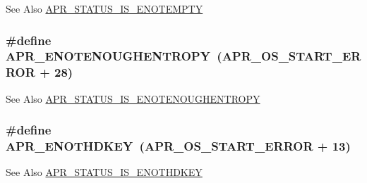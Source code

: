\begin{DoxySeeAlso}{See Also}
\hyperlink{group___a_p_r___s_t_a_t_u_s___i_s_ga6cced4e794d3e7ed6dae3e53c337cc02}{A\-P\-R\-\_\-\-S\-T\-A\-T\-U\-S\-\_\-\-I\-S\-\_\-\-E\-N\-O\-T\-E\-M\-P\-T\-Y} 
\end{DoxySeeAlso}
\hypertarget{group___a_p_r___error_gaaee9e4e763844197e3750bb66ff75cd0}{
\subsubsection[{A\-P\-R\-\_\-\-E\-N\-O\-T\-E\-N\-O\-U\-G\-H\-E\-N\-T\-R\-O\-P\-Y}]{\setlength{\rightskip}{0pt plus 5cm}\#define A\-P\-R\-\_\-\-E\-N\-O\-T\-E\-N\-O\-U\-G\-H\-E\-N\-T\-R\-O\-P\-Y~({\bf A\-P\-R\-\_\-\-O\-S\-\_\-\-S\-T\-A\-R\-T\-\_\-\-E\-R\-R\-O\-R} + 28)}}\label{group___a_p_r___error_gaaee9e4e763844197e3750bb66ff75cd0}
\begin{DoxySeeAlso}{See Also}
\hyperlink{group___a_p_r___s_t_a_t_u_s___i_s_gab8b0af2df80bfb9edfc8dbcbb6bdf925}{A\-P\-R\-\_\-\-S\-T\-A\-T\-U\-S\-\_\-\-I\-S\-\_\-\-E\-N\-O\-T\-E\-N\-O\-U\-G\-H\-E\-N\-T\-R\-O\-P\-Y} 
\end{DoxySeeAlso}
\hypertarget{group___a_p_r___error_ga29faf801fac647a14360e7493f7fd74e}{
\subsubsection[{A\-P\-R\-\_\-\-E\-N\-O\-T\-H\-D\-K\-E\-Y}]{\setlength{\rightskip}{0pt plus 5cm}\#define A\-P\-R\-\_\-\-E\-N\-O\-T\-H\-D\-K\-E\-Y~({\bf A\-P\-R\-\_\-\-O\-S\-\_\-\-S\-T\-A\-R\-T\-\_\-\-E\-R\-R\-O\-R} + 13)}}\label{group___a_p_r___error_ga29faf801fac647a14360e7493f7fd74e}
\begin{DoxySeeAlso}{See Also}
\hyperlink{group___a_p_r___s_t_a_t_u_s___i_s_ga782b37d892214ee60911062791871ae2}{A\-P\-R\-\_\-\-S\-T\-A\-T\-U\-S\-\_\-\-I\-S\-\_\-\-E\-N\-O\-T\-H\-D\-K\-E\-Y} 
\end{DoxySeeAlso}
